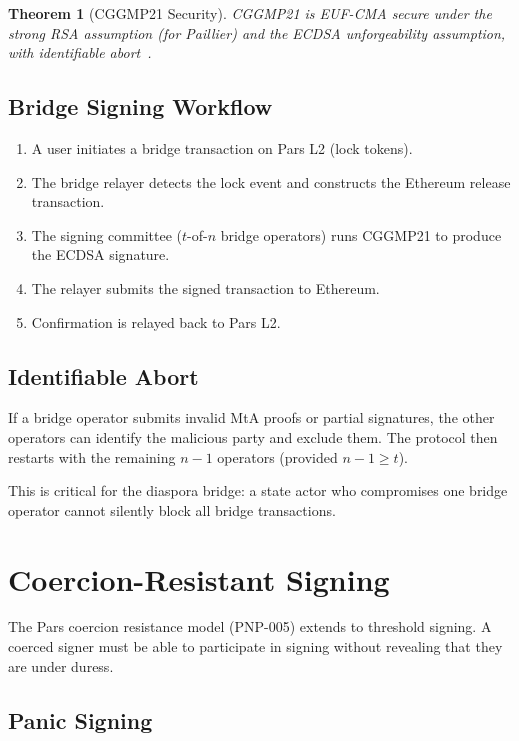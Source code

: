 \documentclass[11pt,a4paper]{article}
\newtheorem{theorem}{Theorem}[section]
\begin{document}
\begin{theorem}[CGGMP21 Security]
    CGGMP21 is EUF-CMA secure under the strong RSA assumption (for
    Paillier) and the ECDSA unforgeability assumption, with
    identifiable abort~\cite{canetti2021cggmp}.
\end{theorem}

\subsection{Bridge Signing Workflow}

\begin{enumerate}
    \item A user initiates a bridge transaction on Pars L2 (lock tokens).
    \item The bridge relayer detects the lock event and constructs the
    Ethereum release transaction.
    \item The signing committee ($t$-of-$n$ bridge operators) runs
    CGGMP21 to produce the ECDSA signature.
    \item The relayer submits the signed transaction to Ethereum.
    \item Confirmation is relayed back to Pars L2.
\end{enumerate}

\subsection{Identifiable Abort}

If a bridge operator submits invalid MtA proofs or partial signatures,
the other operators can identify the malicious party and exclude them.
The protocol then restarts with the remaining $n-1$ operators (provided
$n - 1 \geq t$).

This is critical for the diaspora bridge: a state actor who compromises
one bridge operator cannot silently block all bridge transactions.

\section{Coercion-Resistant Signing}
\label{sec:coercion}

The Pars coercion resistance model (PNP-005) extends to threshold
signing.  A coerced signer must be able to participate in signing
without revealing that they are under duress.

\subsection{Panic Signing}
\end{document}
